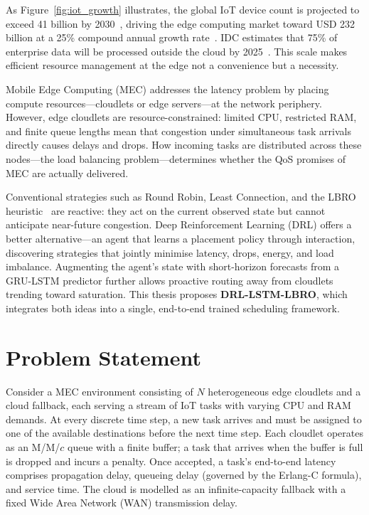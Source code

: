As Figure~\ref{fig:iot_growth} illustrates, the global IoT device
count is projected to exceed 41 billion by 2030~\cite{iotanalytics2023},
driving the edge computing market toward USD 232 billion at a 25\%
compound annual growth rate~\cite{grandview2024edge}. IDC estimates
that 75\% of enterprise data will be processed outside the cloud by
2025~\cite{idc2020data}. This scale makes efficient resource
management at the edge not a convenience but a necessity.

Mobile Edge Computing (MEC) addresses the latency problem by placing
compute resources---cloudlets or edge servers---at the network
periphery. However, edge cloudlets are resource-constrained: limited
CPU, restricted RAM, and finite queue lengths mean that congestion
under simultaneous task arrivals directly causes delays and drops.
How incoming tasks are distributed across these nodes---the load
balancing problem---determines whether the QoS promises of MEC are
actually delivered.

Conventional strategies such as Round Robin, Least Connection, and
the LBRO heuristic~\cite{nayyer2022lbro} are reactive: they act on
the current observed state but cannot anticipate near-future
congestion. Deep Reinforcement Learning (DRL) offers a better
alternative---an agent that learns a placement policy through
interaction, discovering strategies that jointly minimise latency,
drops, energy, and load imbalance. Augmenting the agent's state with
short-horizon forecasts from a GRU-LSTM predictor further allows
proactive routing away from cloudlets trending toward saturation.
This thesis proposes \textbf{DRL-LSTM-LBRO}, which integrates both
ideas into a single, end-to-end trained scheduling framework.

\section{Problem Statement}
\label{sec:problem}

Consider a MEC environment consisting of $N$ heterogeneous edge
cloudlets and a cloud fallback, each serving a stream of IoT tasks
with varying CPU and RAM demands. At every discrete time step, a new
task arrives and must be assigned to one of the available destinations
before the next time step. Each cloudlet operates as an M/M/$c$ queue
with a finite buffer; a task that arrives when the buffer is full is
dropped and incurs a penalty. Once accepted, a task's end-to-end
latency comprises propagation delay, queueing delay (governed by the
Erlang-C formula), and service time. The cloud is modelled as an
infinite-capacity fallback with a fixed Wide Area Network (WAN)
transmission delay.

